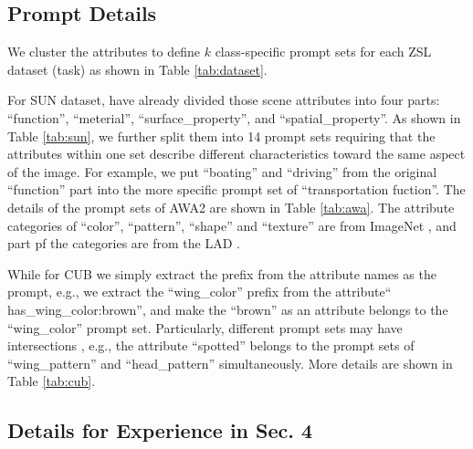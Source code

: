 \documentclass[letterpaper]{article} \usepackage{aaai23}  \usepackage{times}  \usepackage{helvet}  \usepackage{courier}  \usepackage[hyphens]{url}  \usepackage{graphicx} \urlstyle{rm} \def\UrlFont{\rm}  \usepackage{natbib}  \usepackage{caption} \frenchspacing  \setlength{\pdfpagewidth}{8.5in}  \setlength{\pdfpageheight}{11in}  \usepackage{algorithm}
\begin{document}
\subsection{Prompt Details}
We cluster the attributes to define $k$ class-specific prompt set{s} for each ZSL {dataset (task)} as shown in Table \ref{tab:dataset}.

For SUN dataset, \cite{DBLP:conf/cvpr/PattersonH12}  have already divide{d} those scene attributes into four parts: ``function'', ``meterial'', ``surface\_property'', and ``spatial\_property''.
As shown in Table \ref{tab:sun}, we further split them into 14 prompt set{s} 
requiring that the attributes within {one set}
describe different characteristics toward the same aspect of the image.
{For example, we}
put ``boating'' and ``driving'' from {the} original ``function'' {part} 
into {the more specific prompt set of ``transportation fuction''}.
The details {of the prompt sets of}
AWA2 \cite{DBLP:journals/pami/XianLSA19} are shown in Table \ref{tab:awa}.
{The attribute categories of ``color'', ``pattern'', ``shape'' and ``texture'' are from ImageNet \cite{DBLP:conf/cvpr/DengDSLL009}, and part pf the categories are from the LAD \cite{DBLP:conf/cvpr/ZhaoFLWWW19}.}

While for CUB \cite{welinder2010caltech} we simply extract the prefix from the attribute names as the prompt, e.g., we extract the ``wing\_color'' prefix from the attribute`` has\_wing\_color:brown'', and make the ``brown'' as an attribute belongs to the ``wing\_color'' {prompt set.}
Particularly, different {prompt sets}
may  have intersection{s} 
, e.g., the attribute ``spotted'' belongs to {the prompt sets of} ``wing\_pattern'' and ``head\_pattern'' 
simultaneously.
{More} details are shown in Table \ref{tab:cub}.


\subsection{Details for Experience in Sec. 4}\label{apd:hyp}
\end{document}
